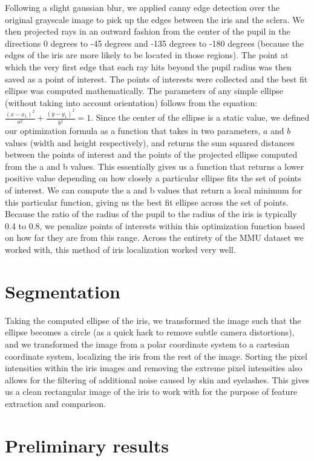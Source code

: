\documentclass[12pt]{article}
\begin{document}
Following a slight gaussian blur, we applied canny edge detection over the original grayscale image to pick up the edges between the iris and the sclera. We then projected rays in an outward fashion from the center of the pupil in the directions 0 degrees to -45 degrees and -135 degrees to -180 degrees (because the edges of the iris are more likely to be located in those regions). The point at which the very first edge that each ray hits beyond the pupil radius was then saved as a point of interest. The points of interests were collected and the best fit ellipse was computed mathematically. The parameters of any simple ellipse (without taking into account orientation) follows from the equation: $\frac{(x-x_1)^2}{a^2} + \frac{(y-y_1)^2}{b^2} = 1$. Since the center of the ellipse is a static value, we defined our optimization formula as a function that takes in two parameters, $a$ and $b$ values (width and height respectively), and returns the sum squared distances between the points of interest and the points of the projected ellipse computed from the a and b values. This essentially gives us a function that returns a lower positive value depending on how closely a particular ellipse fits the set of points of interest. We can compute the a and b values that return a local minimum for this particular function, giving us the best fit ellipse across the set of points. Because the ratio of the radius of the pupil to the radius of the iris is typically 0.4 to 0.8, we penalize points of interests within this optimization function based on how far they are from this range. Across the entirety of the MMU dataset we worked with, this method of iris localization worked very well.


\section{Segmentation}
\label{sec:segment}
Taking the computed ellipse of the iris, we transformed the image such that the ellipse becomes a circle (as a quick hack to remove subtle camera distortions), and we transformed the image from a polar coordinate system to a cartesian coordinate system, localizing the iris from the rest of the image. Sorting the pixel intensities within the iris images and removing the extreme pixel intensities also allows for the filtering of additional noise caused by skin and eyelashes. This gives us a clean rectangular image of the iris to work with for the purpose of feature extraction and comparison. 

\section{Preliminary results}
\label{sec:preliminary}
\end{document}
